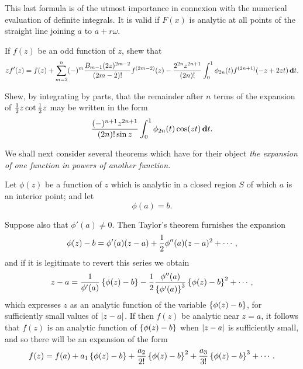 This last formula is of the utmost importance in connexion with the
numerical evaluation of definite integrals. It is valid if $F(x)$ is
analytic at all points of the straight line joining 
$a$ to $a + r \omega$.

\begin{wandwexample}
  If $f(z)$ be an odd function of $z$, shew that
  $$
  z f'(z)
  =
  f(z)
  +
  \sum_{m=2}^{n}
  (-)^{m}
  \frac{B_{m-1} (2z)^{2m-2}}{(2m-2)!}
  f^{(2m-2)}(z)
  -
  \frac{2^{2n} z^{2n+1}}{(2n)!}
  \int_{0}^{1}
  \phi_{2n}(t)
  f^{(2n+1)}(-z + 2zt)
  \, \mathbf{d} t.
  $$
\end{wandwexample}
\begin{wandwexample}
  Shew, by integrating by parts, that the remainder after $n$
  terms of the expansion of $\frac{1}{2} z \cot \frac{1}{2} z$ may be written in the form
  $$
  \frac{ (-)^{n+1} z^{2n+1} }{ (2n)! \sin z }
  \int_{0}^{1} \phi_{2n}(t) \cos (zt) \, \mathbf{d} t.
  $$
\end{wandwexample}

We shall next consider several theorems which have for their object
\emph{the expansion of one function in powers of another function.}

%
%

Let $\phi(z)$ be a function of $z$ which is analytic in a closed
region $S$ of which $a$ is an interior point; and let
$$
\phi(a) = b.
$$

Suppose also that $\phi'(a) \neq 0$. Then Taylor's theorem furnishes the
expansion
$$
\phi(z) - b
=
\phi'(a) (z-a)
+ \frac{1}{2} \phi''(a) (z-a)^{2}
+ \cdots,
$$
and if it is legitimate to revert this series we obtain
$$
z - a
=
\frac{1}{\phi'(a)}
\left\{  \phi(z) - b  \right\}
-
\frac{1}{2} \frac{\phi''(a)}{\left\{ \phi'(a) \right\}^{3}}
\left\{  \phi(z) - b  \right\}^{2}
+ \cdots,
$$
which expresses $z$ as an analytic function of the variable
$\left\{  \phi(z) - b  \right\}$,
for sufficiently small values of $\left| z-a \right|$. If then $f(z)$ be
analytic near $z = a$, it follows that $f(z)$ is an analytic function
of $\left\{  \phi(z) - b  \right\}$
when $\left| z - a \right|$ is sufficiently small, and so there will be an
expansion of the form
$$
f(z)
=
f(a)
+ a_{1} \left\{  \phi(z) - b  \right\}
+ \frac{a_{2}}{2!} \left\{  \phi(z) - b  \right\}^{2}
+ \frac{a_{3}}{3!} \left\{  \phi(z) - b  \right\}^{3}
+ \cdots.
$$

